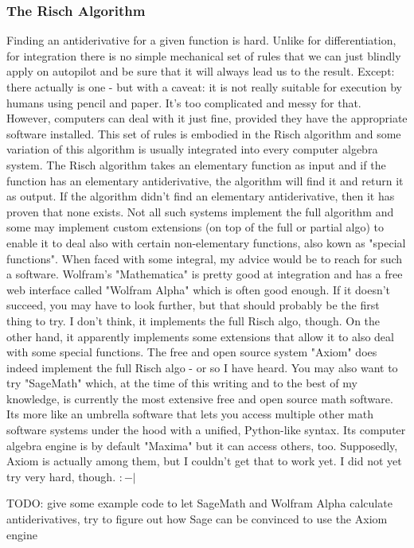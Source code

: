 \subsubsection{The Risch Algorithm}
Finding an antiderivative for a given function is hard. Unlike for differentiation, for integration there is no simple mechanical set of rules that we can just blindly apply on autopilot and be sure that it will always lead us to the result. Except: there actually is one - but with a caveat: it is not really suitable for execution by humans using pencil and paper. It's too complicated and messy for that. However, computers can deal with it just fine, provided they have the appropriate software installed. This set of rules is embodied in the Risch algorithm and some variation of this algorithm is usually integrated into every computer algebra system. The Risch algorithm takes an elementary function as input and if the function has an elementary antiderivative, the algorithm will find it and return it as output. If the algorithm didn't find an elementary antiderivative, then it has proven that none exists. Not all such systems implement the full algorithm and some may implement custom extensions (on top of the full or partial algo) to enable it to deal also with certain non-elementary functions, also kown as "special functions". When faced with some integral, my advice would be to reach for such a software. Wolfram's "Mathematica" is pretty good at integration and has a free web interface called "Wolfram Alpha" which is often good enough. If it doesn't succeed, you may have to look further, but that should probably be the first thing to try. I don't think, it implements the full Risch algo, though. On the other hand, it apparently implements some extensions that allow it to also deal with some special functions. The free and open source system "Axiom" does indeed implement the full Risch algo - or so I have heard. You may also want to try "SageMath" which, at the time of this writing and to the best of my knowledge, is currently the most extensive free and open source math software. Its more like an umbrella software that lets you access multiple other math software systems under the hood with a unified, Python-like syntax. Its computer algebra engine is by default "Maxima" but it can access others, too. Supposedly, Axiom is actually among them, but I couldn't get that to work yet. I did not yet try very hard, though. $:-|$

TODO: give some example code to let SageMath and Wolfram Alpha calculate antiderivatives, try to figure out how Sage can be convinced to use the Axiom engine





